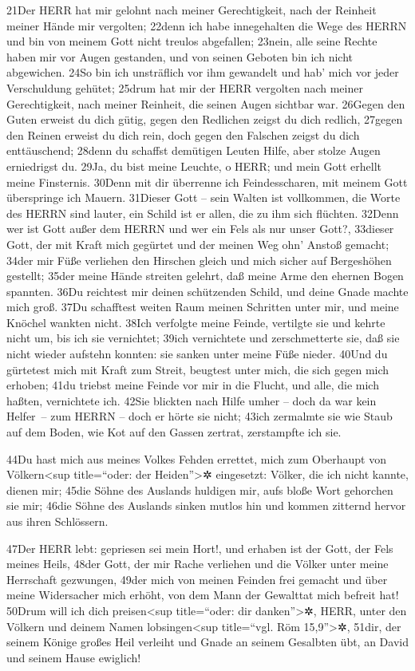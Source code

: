 21Der HERR hat mir gelohnt nach meiner Gerechtigkeit, nach der Reinheit
meiner Hände mir vergolten; 22denn ich habe innegehalten die Wege des
HERRN und bin von meinem Gott nicht treulos abgefallen; 23nein, alle
seine Rechte haben mir vor Augen gestanden, und von seinen Geboten bin
ich nicht abgewichen. 24So bin ich unsträflich vor ihm gewandelt und
hab' mich vor jeder Verschuldung gehütet; 25drum hat mir der HERR
vergolten nach meiner Gerechtigkeit, nach meiner Reinheit, die seinen
Augen sichtbar war. 26Gegen den Guten erweist du dich gütig, gegen den
Redlichen zeigst du dich redlich, 27gegen den Reinen erweist du dich
rein, doch gegen den Falschen zeigst du dich enttäuschend; 28denn du
schaffst demütigen Leuten Hilfe, aber stolze Augen erniedrigst du. 29Ja,
du bist meine Leuchte, o HERR; und mein Gott erhellt meine Finsternis.
30Denn mit dir überrenne ich Feindesscharen, mit meinem Gott überspringe
ich Mauern. 31Dieser Gott -- sein Walten ist vollkommen, die Worte des
HERRN sind lauter, ein Schild ist er allen, die zu ihm sich flüchten.
32Denn wer ist Gott außer dem HERRN und wer ein Fels als nur unser
Gott?, 33dieser Gott, der mit Kraft mich gegürtet und der meinen Weg
ohn' Anstoß gemacht; 34der mir Füße verliehen den Hirschen gleich und
mich sicher auf Bergeshöhen gestellt; 35der meine Hände streiten
gelehrt, daß meine Arme den ehernen Bogen spannten. 36Du reichtest mir
deinen schützenden Schild, und deine Gnade machte mich groß. 37Du
schafftest weiten Raum meinen Schritten unter mir, und meine Knöchel
wankten nicht. 38Ich verfolgte meine Feinde, vertilgte sie und kehrte
nicht um, bis ich sie vernichtet; 39ich vernichtete und zerschmetterte
sie, daß sie nicht wieder aufstehn konnten: sie sanken unter meine Füße
nieder. 40Und du gürtetest mich mit Kraft zum Streit, beugtest unter
mich, die sich gegen mich erhoben; 41du triebst meine Feinde vor mir in
die Flucht, und alle, die mich haßten, vernichtete ich. 42Sie blickten
nach Hilfe umher -- doch da war kein Helfer~-- zum HERRN -- doch er
hörte sie nicht; 43ich zermalmte sie wie Staub auf dem Boden, wie Kot
auf den Gassen zertrat, zerstampfte ich sie.

44Du hast mich aus meines Volkes Fehden errettet, mich zum Oberhaupt von
Völkern\textless sup title=``oder: der Heiden''\textgreater✲ eingesetzt:
Völker, die ich nicht kannte, dienen mir; 45die Söhne des Auslands
huldigen mir, aufs bloße Wort gehorchen sie mir; 46die Söhne des
Auslands sinken mutlos hin und kommen zitternd hervor aus ihren
Schlössern.

47Der HERR lebt: gepriesen sei mein Hort!, und erhaben ist der Gott, der
Fels meines Heils, 48der Gott, der mir Rache verliehen und die Völker
unter meine Herrschaft gezwungen, 49der mich von meinen Feinden frei
gemacht und über meine Widersacher mich erhöht, von dem Mann der
Gewalttat mich befreit hat! 50Drum will ich dich preisen\textless sup
title=``oder: dir danken''\textgreater✲, HERR, unter den Völkern und
deinem Namen lobsingen\textless sup title=``vgl. Röm
15,9''\textgreater✲, 51dir, der seinem Könige großes Heil verleiht und
Gnade an seinem Gesalbten übt, an David und seinem Hause ewiglich!

